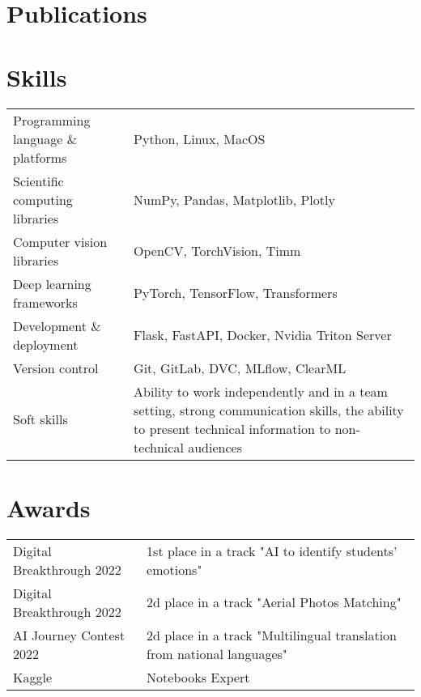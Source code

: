 \documentclass[a4paper,12pt]{article}
\begin{document}
\section{Publications}
\begin{refsection}
\nocite{*}
\printbibliography[heading=none]
\end{refsection}


\section{Skills}
\begin{tabularx}{\linewidth}{@{}l X@{}}
Programming language \& platforms &  \normalsize{Python, Linux, MacOS}\\
Scientific computing libraries &  \normalsize{NumPy, Pandas, Matplotlib, Plotly}\\  
Computer vision libraries &  \normalsize{OpenCV, TorchVision, Timm}\\  
Deep learning frameworks &  \normalsize{PyTorch, TensorFlow, Transformers}\\  
Development \& deployment &  \normalsize{Flask, FastAPI, Docker, Nvidia Triton Server}\\  
Version control &  \normalsize{Git, GitLab, DVC, MLflow, ClearML}\\ 
Soft skills & \normalsize{Ability to work independently and in a team setting, strong communication skills, the ability to present technical information to non-technical audiences}
\end{tabularx}

\section{Awards}
\begin{tabularx}{\linewidth}{@{}l X@{}}
Digital Breakthrough 2022 &  \normalsize{1st place in a track "AI to identify students' emotions"}\\
Digital Breakthrough 2022 &  \normalsize{2d place in a track "Aerial Photos Matching"}\\
AI Journey Contest 2022 & \normalsize{2d place in a track "Multilingual translation from national languages"} \\
Kaggle &  \normalsize{Notebooks Expert}
\end{tabularx}


\vfill
\end{document}
